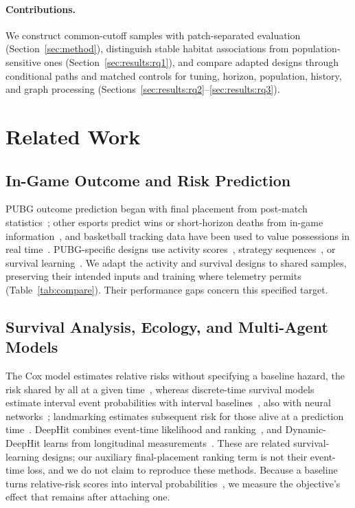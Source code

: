 \documentclass[sigconf,anonymous,nonacm]{acmart}
\begin{document}
\paragraph{Contributions.}
We construct common-cutoff samples with patch-separated evaluation (Section~\ref{sec:method}), distinguish stable habitat associations from population-sensitive ones (Section~\ref{sec:results:rq1}), and compare adapted designs through conditional paths and matched controls for tuning, horizon, population, history, and graph processing (Sections~\ref{sec:results:rq2}--\ref{sec:results:rq3}).

\section{Related Work}
\label{sec:related}

\subsection{In-Game Outcome and Risk Prediction}
\label{sec:related:esports}
PUBG outcome prediction began with final placement from post-match statistics~\cite{KagglePUBG,LeeLee25}; other esports predict wins or short-horizon deaths from in-game information~\cite{Hodge21,Katona19,Marshall22}, and basketball tracking data have been used to value possessions in real time~\cite{Cervone16}.
PUBG-specific designs use activity scores~\cite{Sagong25a}, strategy sequences~\cite{Sagong25b}, or survival learning~\cite{KRAFTON}. We adapt the activity and survival designs to shared samples, preserving their intended inputs and training where telemetry permits (Table~\ref{tab:compare}). Their performance gaps concern this specified target.
\subsection{Survival Analysis, Ecology, and Multi-Agent Models}
\label{sec:related:survival}
The Cox model estimates relative risks without specifying a baseline hazard, the risk shared by all at a given time~\cite{Cox72}, whereas discrete-time survival models estimate interval event probabilities with interval baselines~\cite{SingerWillett93}, also with neural networks~\cite{Gensheimer19}; landmarking estimates subsequent risk for those alive at a prediction time~\cite{vanHouwelingen07}.
DeepHit combines event-time likelihood and ranking~\cite{DeepHit18}, and Dynamic-DeepHit learns from longitudinal measurements~\cite{DynamicDeepHit20}. These are related survival-learning designs; our auxiliary final-placement ranking term is not their event-time loss, and we do not claim to reproduce these methods.
Because a baseline turns relative-risk scores into interval probabilities~\cite{PrenticeGloeckler78}, we measure the objective's effect that remains after attaching one.
\end{document}
